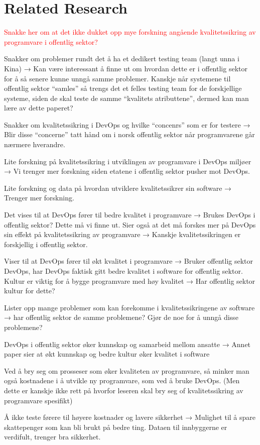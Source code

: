 \chapter{Related Research}

\textcolor{red}{Snakke her om at det ikke dukket opp mye forskning angående kvalitetssikring av programvare i offentlig sektor?}

\cite{nbm_2015} Snakker om problemer rundt det å ha et dedikert testing team (langt unna i Kina) → Kan være interessant å finne ut om hvordan dette er i offentlig sektor for å så senere kunne unngå samme problemer. Kanskje når systemene til offentlig sektor “samles” så trengs det et felles testing team for de forskjellige systeme, siden de skal teste de samme “kvalitets atributtene”, dermed kan man lære av dette paperet?

\cite{dsc_2019} Snakker om kvalitetssikring i DevOps og hvilke “concenrs” som er for testere → Blir disse “concerne” tatt hånd om i norsk offentlig sektor når programvarene går nærmere hverandre.

\cite{ja_2016} Lite forskning på kvalitetssikring i utviklingen av programvare i DevOps miljøer → Vi trenger mer forskning siden etatene i offentlig sektor pusher mot DevOps.

\cite{mk_2017} Lite forskning og data på hvordan utviklere kvalitetssikrer sin software → Trenger mer forskning.

\cite{am_2020} Det vises til at DevOps fører til bedre kvalitet i programvare → Brukes DevOps i offentlig sektor? Dette må vi finne ut. Sier også at det må forskes mer på DevOps sin effekt på kvalitetssikring av programvare → Kanskje kvalitetssikringen er forskjellig i offentlig sektor.

\cite{smm_2018} Viser til at DevOps fører til økt kvalitet i programvare → Bruker offentlig sektor DevOps, har DevOps faktisk gitt bedre kvalitet i software for offentlig sektor. Kultur er viktig for å bygge programvare med høy kvalitet → Har offentlig sektor kultur for dette?

\cite{sh_2018} Lister opp mange problemer som kan forekomme i kvalitetssikringene av software → har offentlig sektor de samme problemene? Gjør de noe for å unngå disse problemene?

\cite{mm_2021} DevOps i offentlig sektor øker kunnskap og samarbeid mellom ansatte → Annet paper sier at økt kunnskap og bedre kultur øker kvalitet i software

\cite{ml_2022} Ved å bry seg om prosseser som øker kvaliteten av programvare, så minker man også kostnadene i å utvikle ny programvare, som ved å bruke DevOps. (Men dette er kanskje ikke rett på hvorfor leseren skal bry seg of kvalitetssikring av programvare spesifikt)

\cite{csw_2011} Å ikke teste førere til høyere kostnader og lavere sikkerhet → Mulighet til å spare skattepenger som kan bli brukt på bedre ting. Dataen til innbyggerne er verdifult, trenger bra sikkerhet.